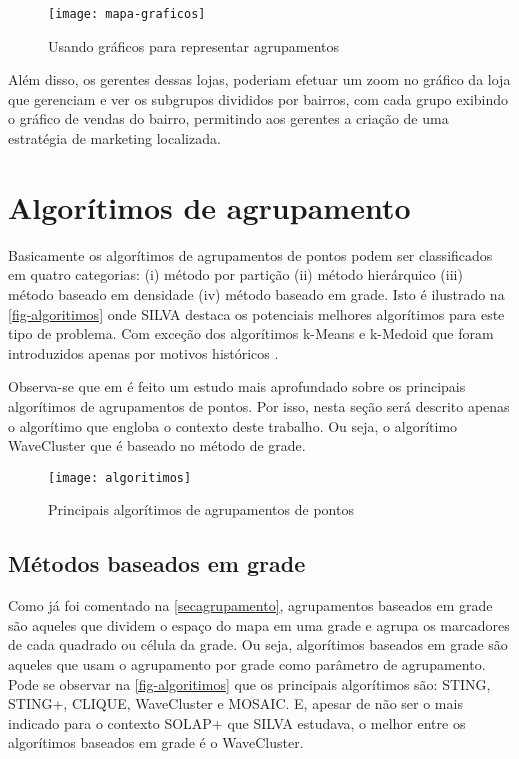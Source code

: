 \begin{figure}[htb]
	\caption{\label{fig-mapa-graficos}Usando gráficos para representar agrupamentos}
	\begin{center}
	    \texttt{[image: mapa-graficos]}
	\end{center}
\end{figure}

	Além disso, os gerentes dessas lojas,  poderiam efetuar um zoom no gráfico da loja que gerenciam e ver os subgrupos divididos por bairros, com cada grupo exibindo o gráfico de vendas do bairro, permitindo aos gerentes a criação de uma estratégia de marketing localizada.
	
\section{Algorítimos de agrupamento}	
	Basicamente os algorítimos de agrupamentos de pontos podem ser classificados em quatro categorias: (i) método por partição (ii) método hierárquico (iii) método baseado em densidade (iv) método baseado em grade. Isto é ilustrado na \autoref{fig-algoritimos} onde SILVA destaca os potenciais melhores algorítimos para este tipo de problema. Com exceção dos algorítimos k-Means e k-Medoid que foram introduzidos apenas por motivos históricos \cite[35]{silva2010solap+}.
	
	Observa-se que em \cite[capítulo 2]{silva2010solap+} é feito um estudo mais aprofundado sobre os principais algorítimos de agrupamentos de pontos. Por isso, nesta seção será descrito apenas o algorítimo que engloba o contexto deste trabalho. Ou seja, o algorítimo WaveCluster que é baseado no método de grade. 
		
\begin{figure}[htb]
	\caption{\label{fig-algoritimos}Principais algorítimos de agrupamentos de pontos}
	\begin{center}
	    \texttt{[image: algoritimos]}
	\end{center}
\end{figure}

		\subsection{Métodos baseados em grade}
		Como já foi comentado na \autoref{secagrupamento}, agrupamentos baseados em grade são aqueles que dividem o espaço do mapa em uma grade e agrupa os marcadores de cada quadrado ou célula da grade.  Ou seja, algorítimos baseados em grade são aqueles que usam o agrupamento por grade como parâmetro de agrupamento. 
		Pode se observar na \autoref{fig-algoritimos} que os principais algorítimos são: STING, STING+, CLIQUE, WaveCluster e MOSAIC. E, apesar de não ser o mais indicado para o contexto SOLAP+ que SILVA estudava, o melhor entre os algorítimos baseados em grade é o WaveCluster.
		

